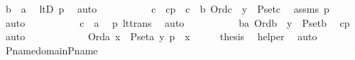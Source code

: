 \begin{isabellebody}
\ {\isachardoublequoteopen}b\ {\isasymin}\ a{\isachardoublequoteclose}\ \isamarkupfalse%
\ ltD\ p{}\ \isamarkupfalse%
\ auto\ \isanewline
\ \ \ \ \ \ \isamarkupfalse%
\ \isamarkupfalse%
\ c\ \ cp\ {\isacharcolon}{\kern0pt}\ {\isachardoublequoteopen}c\ {\isacharless}{\kern0pt}\ b{\isachardoublequoteclose}\ {\isachardoublequoteopen}Ord{\isacharparenleft}{\kern0pt}c{\isacharparenright}{\kern0pt}\ {\isasymand}\ y\ {\isasymin}\ P{\isacharunderscore}{\kern0pt}set{\isacharparenleft}{\kern0pt}c{\isacharparenright}{\kern0pt}{\isachardoublequoteclose}\ \isamarkupfalse%
\ assms\ p{}\ \isamarkupfalse%
\ auto\ \isanewline
\ \ \ \ \ \ \isamarkupfalse%
\ \isamarkupfalse%
\ {\isachardoublequoteopen}c\ {\isacharless}{\kern0pt}\ a{\isachardoublequoteclose}\ \isamarkupfalse%
\ p{}\ lt{\isacharunderscore}{\kern0pt}trans\ \isamarkupfalse%
\ auto\ \isanewline
\ \ \ \ \ \ \isamarkupfalse%
\ \isamarkupfalse%
\ {\isachardoublequoteopen}{\isasymexists}b{\isacharless}{\kern0pt}a{\isachardot}{\kern0pt}\ Ord{\isacharparenleft}{\kern0pt}b{\isacharparenright}{\kern0pt}\ {\isasymand}\ y\ {\isasymin}\ P{\isacharunderscore}{\kern0pt}set{\isacharparenleft}{\kern0pt}b{\isacharparenright}{\kern0pt}{\isachardoublequoteclose}\ \isamarkupfalse%
\ cp\ \isamarkupfalse%
\ auto\ \isanewline
\ \ \ \ \isamarkupfalse%
\isanewline
\ \ \isamarkupfalse%
\isanewline
\ \ \isamarkupfalse%
\ {\isachardoublequoteopen}Ord{\isacharparenleft}{\kern0pt}a{\isacharparenright}{\kern0pt}{\isachardoublequoteclose}\ {\isachardoublequoteopen}x\ {\isasymin}\ P{\isacharunderscore}{\kern0pt}set{\isacharparenleft}{\kern0pt}a{\isacharparenright}{\kern0pt}{\isachardoublequoteclose}\ {\isachardoublequoteopen}{\isacharless}{\kern0pt}y{\isacharcomma}{\kern0pt}\ p{\isachargreater}{\kern0pt}\ {\isasymin}\ x{\isachardoublequoteclose}\isanewline
\ \ \isamarkupfalse%
\ \isamarkupfalse%
\ {\isacharquery}{\kern0pt}thesis\ \isamarkupfalse%
\ helper\ \isamarkupfalse%
\ auto\ \isanewline
{}\isamarkupfalse%
%
\endisatagproof
{\isafoldproof}%
%
\isadelimproof
\ \isanewline
%
\endisadelimproof
\isanewline
{}\isamarkupfalse%
\ P{\isacharunderscore}{\kern0pt}name{\isacharunderscore}{\kern0pt}domain{\isacharunderscore}{\kern0pt}P{\isacharunderscore}{\kern0pt}name\ {\isacharcolon}{\kern0pt}\ \isanewline

\end{isabellebody}
